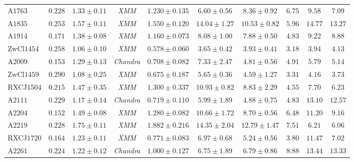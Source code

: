\documentclass[iop, apj]{emulateapj}
\newcommand{\?}{\stackrel{?}{=}}
\begin{document}
\begin{table*}[H]
\begin{center}
\begin{tabular}{lccccccccc}
 A$1763$ &$0.228$ &$1.33\pm0.11$ &{\it XMM} &$1.230\pm0.135$  &$6.60\pm0.56$ &$8.36\pm0.92$   & $6.75$ & $9.58$  & $7.09$  \\%
 A$1835$ &$0.253$ &$1.57\pm0.11$ &{\it XMM} &$1.550\pm0.120$ &$14.04\pm1.27$ &$10.53\pm0.82$   & $5.96$ & $14.77$ & $13.27$ \\%
 A$1914$ &$0.171$ &$1.38\pm0.08$ &{\it XMM} &$1.160\pm0.073$  &$8.08\pm1.00$ &$7.88\pm0.50$   & $4.83$ & $9.22$  & $8.88$ \\%
 ZwCl$1454$ &$0.258$ &$1.06\pm0.10$ &{\it XMM} &$0.578\pm0.060$ &$3.65\pm0.42$ &$3.93\pm0.41$ & $3.18$ & $3.94$  & $4.13$  \\%
 A$2009$ &$0.153$ &$1.29\pm0.13$ &{\it Chandra}	  &$0.708\pm0.082$  &$7.33\pm2.47$ &$4.81\pm0.56$     & $4.91$ & $5.79$  & $5.14$  \\%
 ZwCl$1459$ &$0.290$ &$1.08\pm0.25$ &{\it XMM} &$0.675\pm0.187$ &$5.65\pm0.36$ &$4.59\pm1.27$ & $3.31$ & $4.16$  & $3.73$  \\%
 RXCJ$1504$ &$0.215$ &$1.47\pm0.35$ &{\it XMM} &$1.300\pm0.337$ &$10.93\pm0.82$ &$8.83\pm2.29$& $4.55$ & $7.70$  & $6.23$  \\%
 A$2111$ &$0.229$ &$1.17\pm0.14$ &{\it Chandra}	  &$0.719\pm0.110$  &$5.99\pm1.89$ &$4.88\pm0.75$     & $4.83$ & $13.10$ & $12.57$ \\%
 A$2204$ &$0.152$ &$1.49\pm0.08$ &{\it XMM} &$1.280\pm0.082$ &$10.66\pm1.72$ &$8.70\pm0.56$   & $6.48$ & $11.20$ & $9.16$ \\%
 A$2219$ &$0.228$ &$1.75\pm0.11$ &{\it XMM} &$1.882\pm0.216$
    &$14.35\pm2.04$ &$12.79\pm1.47$   & $7.51$ & $6.21$  & $6.06$  \\%
 RXCJ$1720$ &$0.164$ &$1.23\pm0.11$ &{\it XMM} &$0.771\pm0.083$ &$6.97\pm0.68$ &$5.24\pm0.56$ & $3.80$ & $11.47$ & $7.02$  \\%
 A$2261$ &$0.224$ &$1.22\pm0.12$ &{\it Chandra}	  &$1.000\pm0.127$  &$6.75\pm1.89$ &$6.79\pm0.86$     & $8.88$ & $13.44$ & $13.33$ \\%

\end{tabular}
\end{center}
\end{table*}
\end{document}
